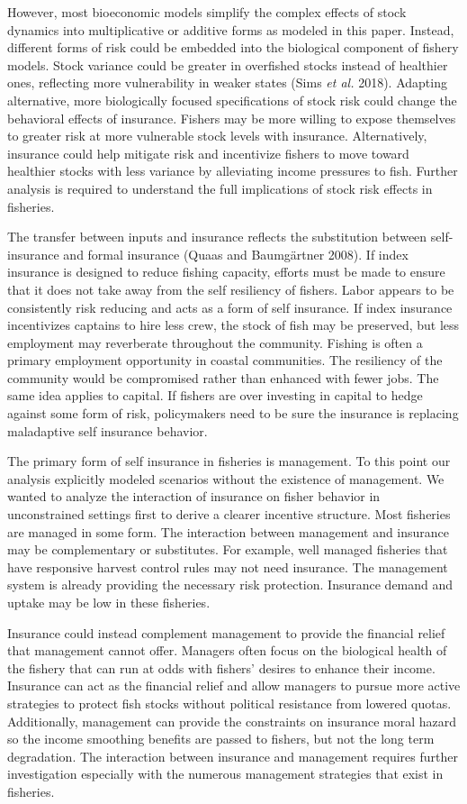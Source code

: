 \documentclass[
  letterpaper,
  DIV=11,
  numbers=noendperiod]{scrartcl}
\theoremstyle{plain}
\theoremstyle{plain}
\theoremstyle{remark}
\begin{document}
However, most bioeconomic models simplify the complex effects of stock
dynamics into multiplicative or additive forms as modeled in this paper.
Instead, different forms of risk could be embedded into the biological
component of fishery models. Stock variance could be greater in
overfished stocks instead of healthier ones, reflecting more
vulnerability in weaker states (Sims \emph{et al.} 2018). Adapting
alternative, more biologically focused specifications of stock risk
could change the behavioral effects of insurance. Fishers may be more
willing to expose themselves to greater risk at more vulnerable stock
levels with insurance. Alternatively, insurance could help mitigate risk
and incentivize fishers to move toward healthier stocks with less
variance by alleviating income pressures to fish. Further analysis is
required to understand the full implications of stock risk effects in
fisheries.

The transfer between inputs and insurance reflects the substitution
between self-insurance and formal insurance (Quaas and Baumgärtner
2008). If index insurance is designed to reduce fishing capacity,
efforts must be made to ensure that it does not take away from the self
resiliency of fishers. Labor appears to be consistently risk reducing
and acts as a form of self insurance. If index insurance incentivizes
captains to hire less crew, the stock of fish may be preserved, but less
employment may reverberate throughout the community. Fishing is often a
primary employment opportunity in coastal communities. The resiliency of
the community would be compromised rather than enhanced with fewer jobs.
The same idea applies to capital. If fishers are over investing in
capital to hedge against some form of risk, policymakers need to be sure
the insurance is replacing maladaptive self insurance behavior.

The primary form of self insurance in fisheries is management. To this
point our analysis explicitly modeled scenarios without the existence of
management. We wanted to analyze the interaction of insurance on fisher
behavior in unconstrained settings first to derive a clearer incentive
structure. Most fisheries are managed in some form. The interaction
between management and insurance may be complementary or substitutes.
For example, well managed fisheries that have responsive harvest control
rules may not need insurance. The management system is already providing
the necessary risk protection. Insurance demand and uptake may be low in
these fisheries.

Insurance could instead complement management to provide the financial
relief that management cannot offer. Managers often focus on the
biological health of the fishery that can run at odds with fishers'
desires to enhance their income. Insurance can act as the financial
relief and allow managers to pursue more active strategies to protect
fish stocks without political resistance from lowered quotas.
Additionally, management can provide the constraints on insurance moral
hazard so the income smoothing benefits are passed to fishers, but not
the long term degradation. The interaction between insurance and
management requires further investigation especially with the numerous
management strategies that exist in fisheries.
\end{document}
